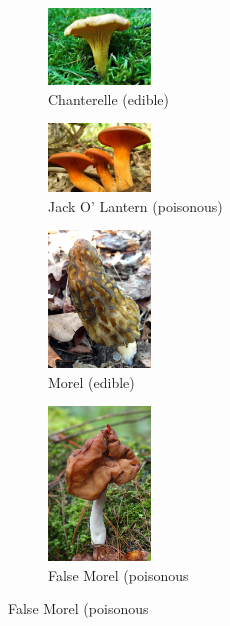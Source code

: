 \documentclass[journal]{IEEEtran}
\begin{document}
\begin{figure}[ht]
\centering
\begin{subfigure}[b]{0.45\textwidth}
\includegraphics[width=0.3\textwidth]{imgs/chanterelle(double_edible_1).jpg}
\caption{Chanterelle (edible)}
\end{subfigure}
\hfill
\begin{subfigure}[b]{0.45\textwidth}
\includegraphics[width=0.3\textwidth]{imgs/jack_o_lantern(double_poisonous_1).jpg}
\caption{Jack O' Lantern (poisonous)}
\end{subfigure}

\medskip
\newpage

\begin{subfigure}[b]{0.45\textwidth}
\includegraphics[width=0.3\textwidth]{imgs/morel(double_edible_2).jpg}
\caption{Morel (edible)}
\end{subfigure}
\hfill
\begin{subfigure}[b]{0.45\textwidth}
\includegraphics[width=0.3\textwidth]{imgs/false_morel(double_poisonous_2).jpg}
\caption{False Morel (poisonous}
\end{subfigure}


\end{figure}
\end{document}
